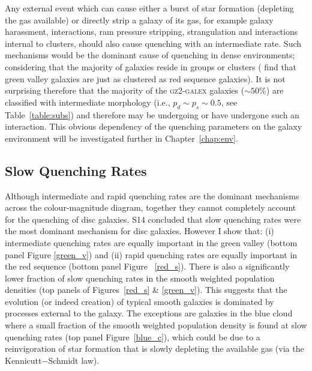 Any external event which can cause either a burst of star formation (depleting the gas available) or directly strip a galaxy of its gas, for example galaxy harassment, interactions, ram pressure stripping, strangulation and interactions internal to clusters, should also cause quenching with an intermediate rate. Such mechanisms would be the dominant cause of quenching in dense environments; considering that the majority of galaxies reside in groups or clusters (\citealt{Coil08} find that green valley galaxies are just as clustered as red sequence galaxies). It is not surprising therefore that the majority of the \textsc{gz2-galex} galaxies ($\sim50\%$) are classified with intermediate morphology (i.e., $p_d \sim p_s \sim 0.5$, see Table~\ref{table:subs}) and therefore may be undergoing or have undergone such an interaction. This obvious dependency of the quenching parameters on the galaxy environment will be investigated further in Chapter~\ref{chap:env}.


\subsection{Slow Quenching Rates}\label{slow}

Although intermediate and rapid quenching rates are the dominant mechanisms across the colour-magnitude diagram, together they cannot completely account for the quenching of disc galaxies. S14 concluded that slow quenching rates were the most dominant mechanism for disc galaxies. However I show that: (i) intermediate quenching rates are equally important in the green valley (bottom panel Figure \ref{green_v}) and (ii) rapid quenching rates are equally important in the red sequence (bottom panel Figure ~\ref{red_s}). There is also a significantly lower fraction of slow quenching rates in the smooth weighted population densities (top panels of Figures~\ref{red_s} \& \ref{green_v}). This suggests that the evolution (or indeed creation) of typical smooth galaxies is dominated by processes external to the galaxy. The exceptions are galaxies in the blue cloud where a small fraction of the smooth weighted population density is found at slow quenching rates (top panel Figure~\ref{blue_c}), which could be due to a reinvigoration of star formation that is slowly depleting the available gas (via the Kennicutt$-$Schmidt law).

